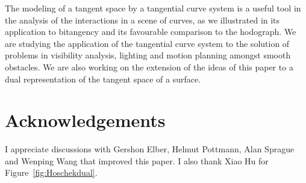 \documentclass[12pt]{article}
\begin{document}
The modeling of a tangent space by a tangential curve system is
a useful tool in the analysis of the interactions in a scene of curves, 
as we illustrated in its application to bitangency 
and its favourable comparison to the hodograph.
We are studying the application of the tangential curve system 
to the solution of problems in visibility analysis,
lighting and motion planning amongst smooth obstacles.
We are also working on the extension of the ideas of this paper to 
a dual representation of the tangent space of a surface.



\section{Acknowledgements}

I appreciate discussions with Gershon Elber, Helmut Pottmann, Alan Sprague
and Wenping Wang that improved this paper.
I also thank Xiao Hu for Figure~\ref{fig:Hoschekdual}.

\end{document}
